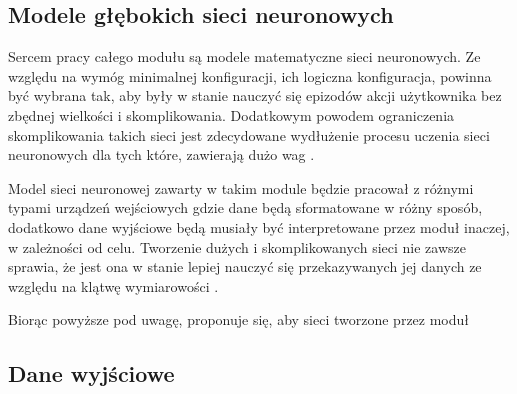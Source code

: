 \subsection{Modele głębokich sieci neuronowych}
Sercem pracy całego modułu są modele matematyczne sieci neuronowych. Ze względu na wymóg minimalnej konfiguracji, ich logiczna konfiguracja, powinna być wybrana tak, aby były w stanie nauczyć się epizodów akcji użytkownika bez zbędnej wielkości i skomplikowania. Dodatkowym powodem ograniczenia skomplikowania takich sieci jest zdecydowane wydłużenie procesu uczenia sieci neuronowych dla tych które, zawierają dużo wag \cite{time_complexity_nn}.

Model sieci neuronowej zawarty w takim module będzie pracował z różnymi typami urządzeń wejściowych gdzie dane będą sformatowane w różny sposób, dodatkowo dane wyjściowe będą musiały być interpretowane przez moduł inaczej, w zależności od celu. Tworzenie dużych i skomplikowanych sieci nie zawsze sprawia, że jest ona w stanie lepiej nauczyć się przekazywanych jej danych ze względu na klątwę wymiarowości \cite{curse_of_dimensionality}.

Biorąc powyższe pod uwagę, proponuje się, aby sieci tworzone przez moduł 

\subsection{Dane wyjściowe}

